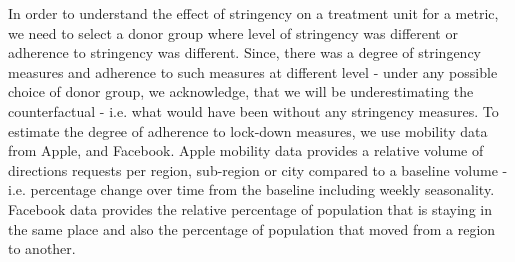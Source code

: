 \documentclass[preprint,authoryear,12pt]{elsarticle}
\begin{document}
    In order to understand the effect of stringency on a treatment unit for a metric, we need to select a donor group where level of stringency was different or adherence to stringency was different. Since, there was a degree of stringency measures and adherence to such measures at different level - under any possible choice of donor group, we acknowledge, that we will be underestimating the counterfactual - i.e. what would have been without any stringency measures. To estimate the degree of adherence to lock-down measures, we use mobility data from Apple, and Facebook. Apple mobility data provides a relative volume of directions requests per region, sub-region or city compared to a baseline volume - i.e. percentage change over time from the baseline including weekly seasonality. Facebook data provides the relative percentage of population that is staying in the same place and also the percentage of population that moved from a region to another.  
    
\end{document}
